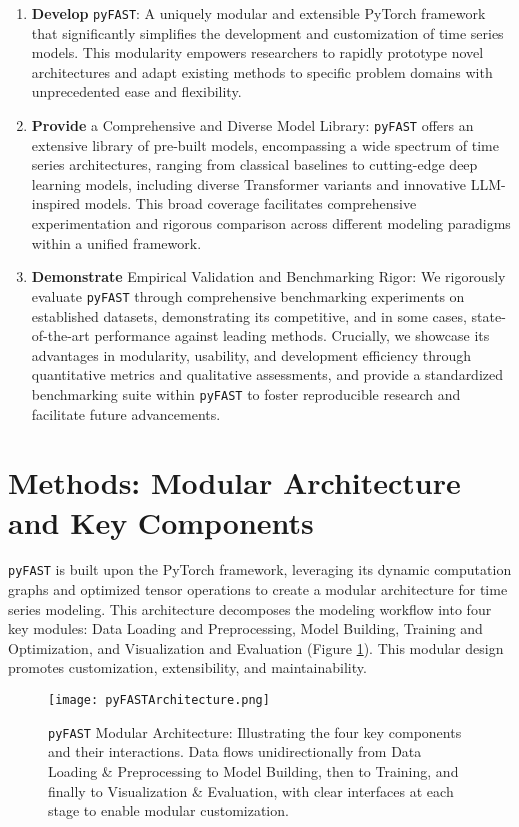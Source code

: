 \documentclass[twoside,11pt]{article}
\begin{document}
\begin{enumerate}
    \item   \textbf{Develop} \texttt{pyFAST}: A uniquely modular and extensible PyTorch framework that significantly simplifies the development and customization of time series models. This modularity empowers researchers to rapidly prototype novel architectures and adapt existing methods to specific problem domains with unprecedented ease and flexibility.
    \item  \textbf{Provide} a Comprehensive and Diverse Model Library: \texttt{pyFAST} offers an extensive library of pre-built models, encompassing a wide spectrum of time series architectures, ranging from classical baselines to cutting-edge deep learning models, including diverse Transformer variants and innovative LLM-inspired models. This broad coverage facilitates comprehensive experimentation and rigorous comparison across different modeling paradigms within a unified framework.
    \item   \textbf{Demonstrate} Empirical Validation and Benchmarking Rigor: We rigorously evaluate \texttt{pyFAST} through comprehensive benchmarking experiments on established datasets, demonstrating its competitive, and in some cases, state-of-the-art performance against leading methods.  Crucially, we showcase its advantages in modularity, usability, and development efficiency through quantitative metrics and qualitative assessments, and provide a standardized benchmarking suite within \texttt{pyFAST} to foster reproducible research and facilitate future advancements.
\end{enumerate}





\section{Methods: Modular Architecture and Key Components}

\texttt{pyFAST} is built upon the PyTorch framework, leveraging its dynamic computation graphs and optimized tensor operations to create a modular architecture for time series modeling. This architecture decomposes the modeling workflow into four key modules: Data Loading and Preprocessing, Model Building, Training and Optimization, and Visualization and Evaluation (Figure \ref{fig:architecture}). This modular design promotes customization, extensibility, and maintainability.

\begin{figure}[h]
    \centering
   \texttt{[image: pyFASTArchitecture.png]} %
    \caption{\texttt{pyFAST} Modular Architecture:  Illustrating the four key components and their interactions.  Data flows unidirectionally from Data Loading \& Preprocessing to Model Building, then to Training, and finally to Visualization \& Evaluation, with clear interfaces at each stage to enable modular customization.}
    \label{fig:architecture}
\end{figure}
\end{document}
